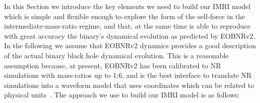  In this Section we introduce the key elements we need to build our IMRI model 
 which is simple and flexible enough to explore the form of the self-force in the
 intermediate-mass-ratio regime, and that, at the same time is able to reproduce 
 with great accuracy the binary's dynamical evolution as predicted by EOBNRv2. In 
 the following we assume that EOBNRv2 dynamics provides a good description of the 
 actual binary black hole dynamical evolution. This is a reasonable assumption 
 because, at present, EOBNRv2 has been calibrated to NR simulations with mass-ratios 
 up to 1:6, and is the best interface to translate NR simulations into a waveform 
 model that uses coordinates which can be related to physical units~\cite{damsh}. 
The approach we use to build our IMRI model is as follows:
 
